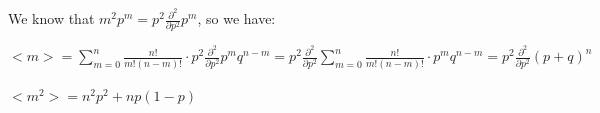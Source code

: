 \documentclass[paper=9in:6in,pagesize=pdftex,headinclude=on,footinclude=on,10pt,bibtotoc,pointlessnumbers,normalheadings,DIV=9,twoside=false]{scrbook}
\begin{document}
\begin{text}
We know that $m^2 p^m = p^2 \frac{\partial^2}{\partial p^2} p^m $, so we have: \\ 
\end{text}

\begin{center}
$<m> = \sum\limits_{m=0}^{n} \frac{n!}{m!(n-m)!} \cdot p^2 \frac{\partial^2}{\partial p^2} p^m q^{n-m} = p^2 \frac{\partial^2}{\partial p^2} \sum\limits_{m=0}^{n} \frac{n!}{m!(n-m)!} \cdot  p^m q^{n-m} =  p^2 \frac{\partial^2}{\partial p^2} (p+q)^n$ \\
\ \\

$<m^2> = n^2p^2 + np(1-p)$ 
\end{center}
\end{document}
